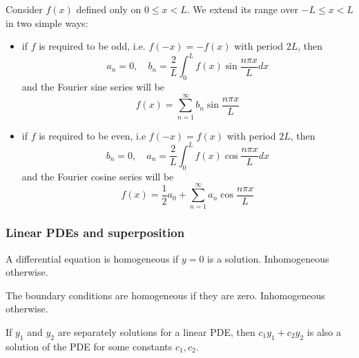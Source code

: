 \documentclass[a4paper]{article}
\begin{document}
\begin{prop}
Consider $f(x)$ defined only on $0\leq x<L$. We extend its range over $-L\leq x<L$ in two simple ways:
\begin{itemize}
    \item if $f$ is required to be odd, i.e. $f(-x)=-f(x)$ with period $2L$, then
    \begin{equation}
        a_n=0,\quad b_n=\frac{2}{L}\int_0^Lf(x)\sin\frac{n\pi x}{L}dx\tag{2.7a}
    \end{equation}
    and the Fourier sine series will be
    \begin{equation}
        f(x)=\sum_{n=1}^\infty b_n\sin\frac{n\pi x}{L}\tag{2.7b}
    \end{equation}
    \item if $f$ is required to be even, i.e $f(-x)=f(x)$ with period $2L$, then
    \begin{equation}
        b_n=0,\quad a_n=\frac{2}{L}\int_0^Lf(x)\cos\frac{n\pi x}{L}dx\tag{2.8a}
    \end{equation}
    and the Fourier cosine series will be
    \begin{equation}
        f(x)=\frac{1}{2}a_0+\sum_{n=1}^\infty a_n\cos\frac{n\pi x}{L}\tag{2.8b}
    \end{equation}
\end{itemize}
\end{prop}
\subsubsection*{Linear PDEs and superposition}
\begin{defi}
  A differential equation is homogeneous if $y=0$ is a solution. Inhomogeneous otherwise.
\end{defi}
\begin{defi}
  The boundary conditions are homogeneous if they are zero. Inhomogeneous otherwise.
\end{defi}
\begin{prop}
If $y_1$ and $y_2$ are separately solutions for a linear PDE, then $c_1y_1+c_2y_2$ is also a solution of the PDE for some constants $c_1,c_2$.
\end{prop}
\end{document}
